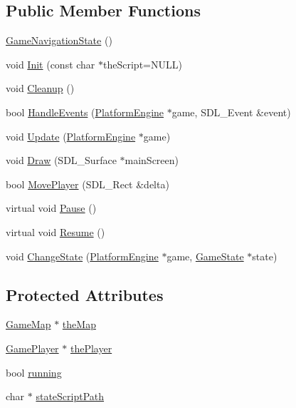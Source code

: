 \subsection*{Public Member Functions}
\begin{CompactItemize}
\item 
\hyperlink{class_game_navigation_state_6a3b93831c85eb5dc3de0a53ca13ddfc}{GameNavigationState} ()
\item 
void \hyperlink{class_game_navigation_state_63c99936c2338e5cfeb71c8ffbd88b7f}{Init} (const char $\ast$theScript=NULL)
\item 
void \hyperlink{class_game_navigation_state_f93a7dbb7eac4b14a6d59cbca32b9abd}{Cleanup} ()
\item 
bool \hyperlink{class_game_navigation_state_6e7c13d35a33478673c62ae55394cfdc}{HandleEvents} (\hyperlink{class_platform_engine}{PlatformEngine} $\ast$game, SDL\_\-Event \&event)
\item 
void \hyperlink{class_game_navigation_state_90f5e6d6287a875d8f2737180f46a004}{Update} (\hyperlink{class_platform_engine}{PlatformEngine} $\ast$game)
\item 
void \hyperlink{class_game_navigation_state_e6b88e854b682be866b2aac2005278a5}{Draw} (SDL\_\-Surface $\ast$mainScreen)
\item 
bool \hyperlink{class_game_navigation_state_40ef4ee4596f6e727e2f6bd7e2a352bf}{MovePlayer} (SDL\_\-Rect \&delta)
\item 
virtual void \hyperlink{class_game_state_0c47c6969a4e0bb32d6cdf7bf9376817}{Pause} ()
\item 
virtual void \hyperlink{class_game_state_d12ece3c3fb066281b73b07a315f04e8}{Resume} ()
\item 
void \hyperlink{class_game_state_f786aeb704a22a135dc289bb89fcc452}{ChangeState} (\hyperlink{class_platform_engine}{PlatformEngine} $\ast$game, \hyperlink{class_game_state}{GameState} $\ast$state)
\end{CompactItemize}
\subsection*{Protected Attributes}
\begin{CompactItemize}
\item 
\hyperlink{class_game_map}{GameMap} $\ast$ \hyperlink{class_game_navigation_state_83154f9523275696f30c13447e1d74f3}{theMap}
\item 
\hyperlink{class_game_player}{GamePlayer} $\ast$ \hyperlink{class_game_navigation_state_9e4cbab2137458ae14ed1deb84bad2bc}{thePlayer}
\item 
bool \hyperlink{class_game_state_391df04a740c7480270d3c71a578b43a}{running}
\item 
char $\ast$ \hyperlink{class_game_state_bfe09abe78dd5794426964d3392b2973}{stateScriptPath}
\end{CompactItemize}


